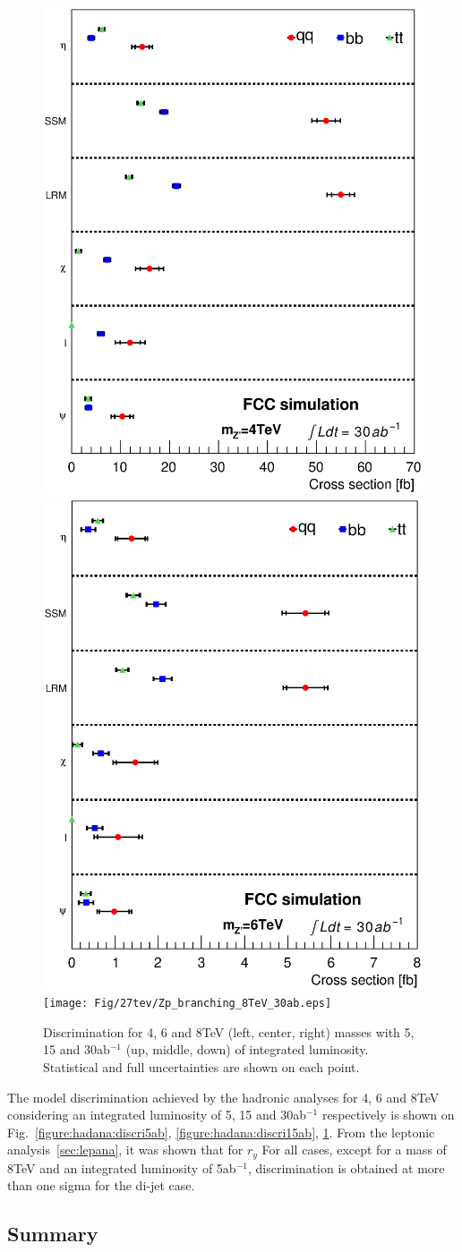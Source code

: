 \begin{figure}[h]
    \includegraphics[width=0.3\columnwidth]{Fig/27tev/Zp_branching_4TeV_30ab.eps}
    \includegraphics[width=0.3\columnwidth]{Fig/27tev/Zp_branching_6TeV_30ab.eps}
    \texttt{[image: Fig/27tev/Zp\_branching\_8TeV\_30ab.eps]}
  \caption{Discrimination for 4, 6 and 8TeV (left, center, right) masses with 5, 15 and 30ab$^{-1}$ (up, middle, down) of integrated luminosity. Statistical and full uncertainties are shown on each point.}
  \label{figure:hadana:discri30ab}
\end{figure}

The model discrimination achieved by the hadronic analyses for 4, 6 and 8TeV considering an integrated luminosity of 
5, 15 and 30ab$^{-1}$ respectively is shown on Fig.~\ref{figure:hadana:discri5ab}, \ref{figure:hadana:discri15ab}, \ref{figure:hadana:discri30ab}.
From the leptonic analysis~\ref{sec:lepana}, it was shown that for $r_y$ 
For all cases, except for a mass of 8TeV and an integrated luminosity of 5ab$^{-1}$, discrimination is obtained at more than one sigma for the di-jet case.


\subsection{Summary}
